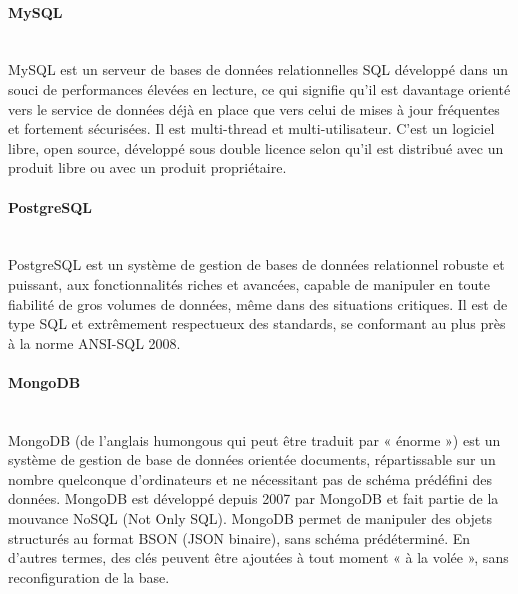 \paragraph{MySQL} 
$ $\\MySQL est un serveur de bases de données relationnelles SQL développé dans un souci de performances élevées en lecture, ce qui signifie qu'il est davantage orienté vers le service de données déjà en place que vers celui de mises à jour fréquentes et fortement sécurisées. Il est multi-thread et multi-utilisateur. C'est un logiciel libre, open source, développé sous double licence selon qu'il est distribué avec un produit libre ou avec un produit propriétaire.

\paragraph{PostgreSQL}
 $ $\\PostgreSQL est un système de gestion de bases de données relationnel robuste et puissant, aux fonctionnalités riches et avancées, capable de manipuler en toute fiabilité de gros volumes de données, même dans des situations critiques. Il est de type SQL et extrêmement respectueux des standards, se conformant au plus près à la norme ANSI-SQL 2008.

\paragraph{MongoDB}
$ $\\MongoDB (de l'anglais humongous qui peut être traduit par « énorme ») est un système de gestion de base de données orientée documents, répartissable sur un nombre quelconque d'ordinateurs et ne nécessitant pas de schéma prédéfini des données. MongoDB est développé depuis 2007 par MongoDB et fait partie de la mouvance NoSQL (Not Only SQL). MongoDB permet de manipuler des objets structurés au format BSON (JSON binaire), sans schéma prédéterminé. En d'autres termes, des clés peuvent être ajoutées à tout moment « à la volée », sans reconfiguration de la base.

